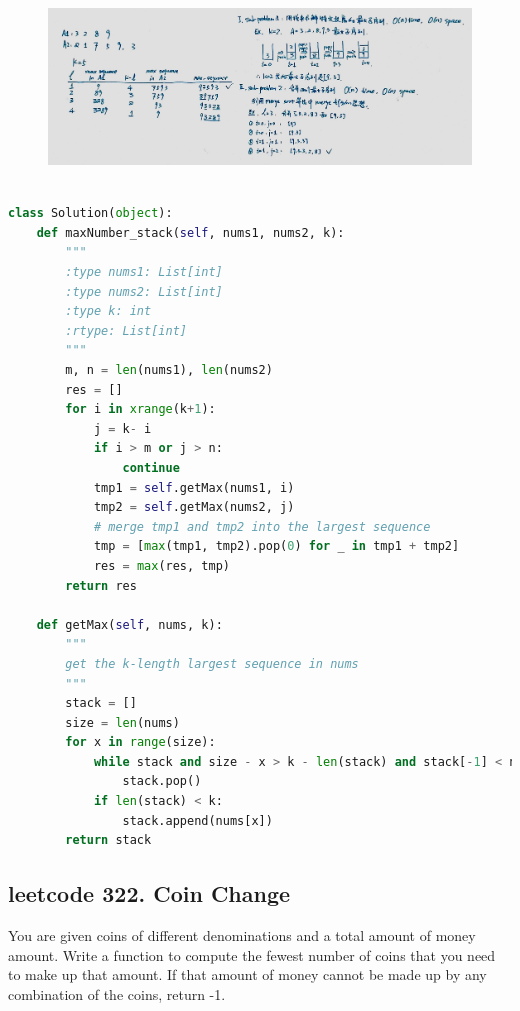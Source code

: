 \documentclass[a4paper,10pt]{article}
\begin{document}
\begin{figure}[h]
    \includegraphics[width=\textwidth]{leetcode321.jpg}
    \centering\\
\end{figure}

\begin{lstlisting}[language=Python, caption=Problem321. Create Maximum Number]

class Solution(object):
    def maxNumber_stack(self, nums1, nums2, k):
        """
        :type nums1: List[int]
        :type nums2: List[int]
        :type k: int
        :rtype: List[int]
        """
        m, n = len(nums1), len(nums2)
        res = []
        for i in xrange(k+1):
            j = k- i
            if i > m or j > n:
                continue
            tmp1 = self.getMax(nums1, i)
            tmp2 = self.getMax(nums2, j)
            # merge tmp1 and tmp2 into the largest sequence
            tmp = [max(tmp1, tmp2).pop(0) for _ in tmp1 + tmp2]
            res = max(res, tmp)
        return res

    def getMax(self, nums, k):
        """
        get the k-length largest sequence in nums
        """
        stack = []
        size = len(nums)
        for x in range(size):
            while stack and size - x > k - len(stack) and stack[-1] < nums[x]:
                stack.pop()
            if len(stack) < k:
                stack.append(nums[x])
        return stack
\end{lstlisting}



\subsection{leetcode 322. Coin Change}
You are given coins of different denominations and a total amount of money amount. Write a function to compute the fewest number of coins that you need to make up that amount. If that amount of money cannot be made up by any combination of the coins, return -1. \\
\end{document}
